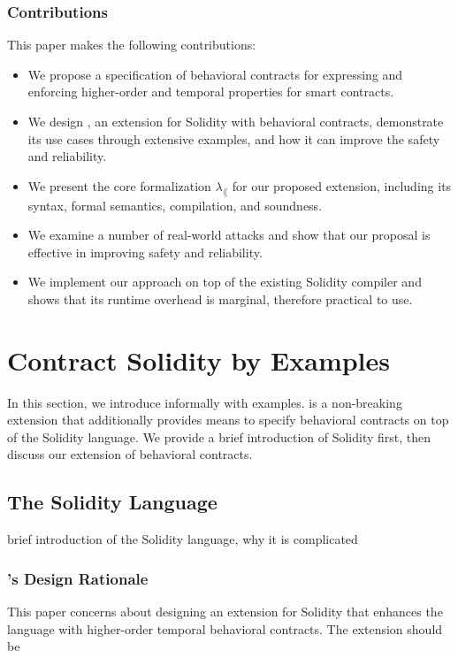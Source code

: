 \documentclass[acmsmall,review,anonymous]{acmart}\settopmatter{printfolios=true,printccs=false,printacmref=false}
\begin{document}



\subsubsection*{\textbf{Contributions}} This paper makes the following contributions:
\begin{itemize}
  \item We propose a specification of behavioral contracts for expressing and
    enforcing higher-order and temporal properties for smart contracts.
  \item We design \lang, an extension for Solidity with
    behavioral contracts, demonstrate its use cases through extensive examples,
    and how it can improve the safety and reliability.
  \item We present the core formalization $\lambda_\lang$ for our proposed
    extension, including its syntax, formal semantics, compilation, and
    soundness.
  \item We examine a number of real-world attacks and show that our proposal is
    effective in improving safety and reliability.
  \item We implement our approach on top of the existing Solidity compiler and shows
    that its runtime overhead is marginal, therefore practical to use.
\end{itemize}

\section{Contract Solidity by Examples}

In this section, we introduce \lang informally with examples.
\lang is a non-breaking extension that additionally provides means
to specify behavioral contracts on top of the Solidity language. We provide
a brief introduction of Solidity first, then discuss our extension of behavioral
contracts.

\subsection{The Solidity Language}

brief introduction of the Solidity language, why it is complicated

\subsubsection*{\textbf{\lang's Design Rationale}}
This paper concerns about designing an extension for Solidity that enhances the
language with higher-order temporal behavioral contracts.
The extension should be
\end{document}
